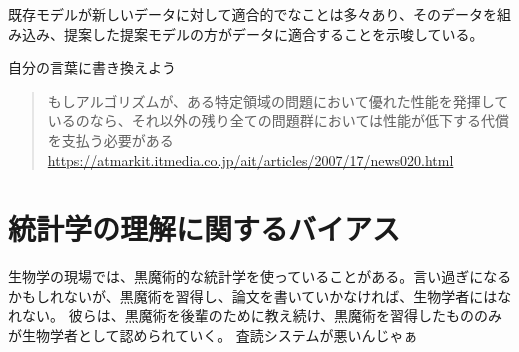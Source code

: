 既存モデルが新しいデータに対して適合的でなことは多々あり、そのデータを組み込み、提案した提案モデルの方がデータに適合することを示唆している。

\fi


自分の言葉に書き換えよう
\begin{quote}
    もしアルゴリズムが、ある特定領域の問題において優れた性能を発揮しているのなら、それ以外の残り全ての問題群においては性能が低下する代償を支払う必要がある
    \url{https://atmarkit.itmedia.co.jp/ait/articles/2007/17/news020.html}    
\end{quote}
\fi 


\section{統計学の理解に関するバイアス}
生物学の現場では、黒魔術的な統計学を使っていることがある。言い過ぎになるかもしれないが、黒魔術を習得し、論文を書いていかなければ、生物学者にはなれない。
彼らは、黒魔術を後輩のために教え続け、黒魔術を習得したもののみが生物学者として認められていく。
査読システムが悪いんじゃぁ

\fi

